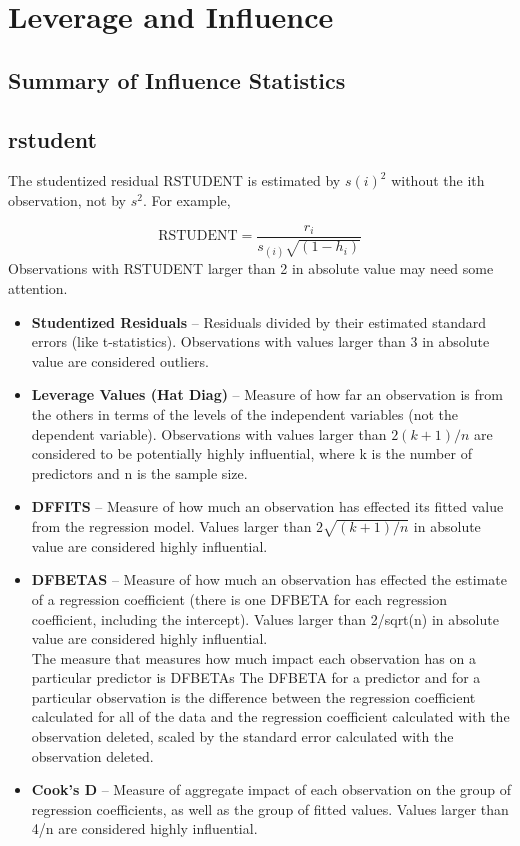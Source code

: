 


	\section{Leverage and Influence}
	
	\subsection{Summary of Influence Statistics}
	\subsection{rstudent}
	The studentized residual RSTUDENT is estimated by $s(i)^2$ without the ith observation, not by $s^2$. For example,
	
	\[\mbox{RSTUDENT} = \frac{r_i}{s_{(i)} \sqrt{(1 - h_i)}} \]
	Observations with RSTUDENT larger than 2 in absolute value may need some attention.
	
	
	
	
	
	\begin{itemize}
		\item	\textbf{Studentized Residuals} – Residuals divided by their estimated standard errors (like t-statistics). Observations with values larger than 3 in absolute value are considered outliers.
		\item	\textbf{Leverage Values (Hat Diag)} – Measure of how far an observation is from the others in terms of the levels of the independent variables (not the dependent variable). Observations with values larger than $2(k+1)/n$ are considered to be potentially highly influential, where k is the number of predictors and n is the sample size.
		\item	\textbf{DFFITS} – Measure of how much an observation has effected its fitted value from the regression model. Values larger than $2\sqrt{(k+1)/n}$ in absolute value are considered highly influential. %
		\item	\textbf{DFBETAS} – Measure of how much an observation has effected the estimate of a regression coefficient (there is one DFBETA for each regression coefficient, including the intercept). Values larger than 2/sqrt(n) in absolute value are considered highly influential.
		\\
		The measure that measures how much impact each observation has on a particular predictor is DFBETAs The DFBETA for a predictor and for a particular observation is the difference between the regression coefficient calculated for all of the data and the regression coefficient calculated with the observation deleted, scaled by the standard error calculated with the observation deleted. 
		
		\item	\textbf{Cook’s D} – Measure of aggregate impact of each observation on the group of regression coefficients, as well as the group of fitted values. Values larger than 4/n are considered highly influential.
	\end{itemize}
	
